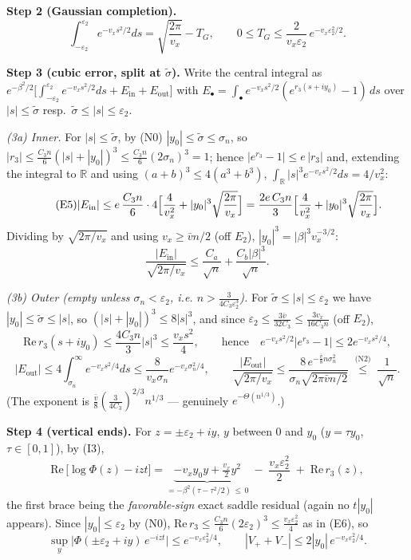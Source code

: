 \documentclass[
]{article}
\begin{document}
\textbf{Step 2 (Gaussian completion).}
\[
  \tag{E3}
  \int_{-\varepsilon_2}^{\varepsilon_2}e^{-v_xs^2/2}ds
  =\sqrt{\frac{2\pi}{v_x}}-T_G,
  \qquad
  0\le T_G\le\frac{2}{v_x\varepsilon_2}\,
  e^{-v_x\varepsilon_2^2/2}.
\]

\textbf{Step 3 (cubic error, split at $\tilde\sigma$).}  Write the
central integral as
$e^{-\beta^2/2}\bigl[\int_{-\varepsilon_2}^{\varepsilon_2}
e^{-v_xs^2/2}ds+E_{\mathrm{in}}+E_{\mathrm{out}}\bigr]$ with
$E_{\bullet}=\int_{\bullet}e^{-v_xs^2/2}(e^{r_3(s+iy_0)}-1)\,ds$ over
$|s|\le\tilde\sigma$ resp.\ $\tilde\sigma\le|s|\le\varepsilon_2$.

\emph{(3a) Inner.}  For $|s|\le\tilde\sigma$, by (N0)
$|y_0|\le\tilde\sigma\le\sigma_n$, so
$|r_3|\le\tfrac{C_3n}{6}(|s|+|y_0|)^3\le\tfrac{C_3n}{6}(2\sigma_n)^3=1$;
hence $|e^{r_3}-1|\le e\,|r_3|$ and, extending the integral to
$\mathbb R$ and using $(a+b)^3\le4(a^3+b^3)$,
$\int_{\mathbb R}|s|^3e^{-v_xs^2/2}ds=4/v_x^2$:
\[
  \tag{E5}
  |E_{\mathrm{in}}|
  \le e\,\frac{C_3n}{6}\cdot4\Bigl[\frac{4}{v_x^{2}}
  +|y_0|^3\sqrt{\frac{2\pi}{v_x}}\Bigr]
  =\frac{2e\,C_3n}{3}\Bigl[\frac{4}{v_x^{2}}
  +|y_0|^3\sqrt{\frac{2\pi}{v_x}}\Bigr].
\]
Dividing by $\sqrt{2\pi/v_x}$ and using $v_x\ge\bar vn/2$ (off $E_2$),
$|y_0|^3=|\beta|^3v_x^{-3/2}$:
\[
  \tag{E5$'$}
  \frac{|E_{\mathrm{in}}|}{\sqrt{2\pi/v_x}}
  \le\frac{C_a}{\sqrt n}+\frac{C_b|\beta|^3}{\sqrt n}.
\]

\emph{(3b) Outer (empty unless $\sigma_n<\varepsilon_2$, i.e.
$n>\tfrac{3}{4C_3\varepsilon_2^3}$).}  For
$\tilde\sigma\le|s|\le\varepsilon_2$ we have $|y_0|\le\tilde\sigma\le
|s|$, so $(|s|+|y_0|)^3\le8|s|^3$, and since
$\varepsilon_2\le\tfrac{3\bar v}{32C_3}\le\tfrac{3v_x}{16C_3n}$ (off
$E_2$),
\[
  \tag{E6}
  \mathrm{Re}\,r_3(s+iy_0)\le\frac{4C_3n}{3}|s|^3
  \le\frac{v_x s^2}{4},
  \qquad\text{hence}\quad
  e^{-v_xs^2/2}\bigl|e^{r_3}-1\bigr|\le2e^{-v_xs^2/4},
\]
\[
  \tag{E7}
  |E_{\mathrm{out}}|\le4\int_{\sigma_n}^{\infty}e^{-v_xs^2/4}ds
  \le\frac{8}{v_x\sigma_n}e^{-v_x\sigma_n^2/4},
  \qquad
  \frac{|E_{\mathrm{out}}|}{\sqrt{2\pi/v_x}}
  \le\frac{8\,e^{-\frac{\bar v}{8}n\sigma_n^2}}
  {\sigma_n\sqrt{2\pi\bar vn/2}}
  \;\overset{\text{(N2)}}{\le}\;\frac{1}{\sqrt n}.
\]
(The exponent is $\tfrac{\bar v}{8}(\tfrac{3}{4C_3})^{2/3}n^{1/3}$ ---
genuinely $e^{-\Theta(n^{1/3})}$.)

\textbf{Step 4 (vertical ends).}  For $z=\pm\varepsilon_2+iy$, $y$
between $0$ and $y_0$ ($y=\tau y_0$, $\tau\in[0,1]$), by (I3),
\[
  \mathrm{Re}\,\bigl[\log\Phi(z)-izt\bigr]
  =\underbrace{-v_x y_0 y+\tfrac{v_x}{2}y^2}_{=-\beta^2(\tau-\tau^2/2)
  \,\le\,0}
  \;-\;\frac{v_x\varepsilon_2^2}{2}
  \;+\;\mathrm{Re}\,r_3(z),
\]
the first brace being the \emph{favorable-sign} exact saddle residual
(again no $t|y_0|$ appears).  Since $|y_0|\le\varepsilon_2$ by (N0),
$\mathrm{Re}\,r_3\le\tfrac{C_3n}{6}(2\varepsilon_2)^3\le
\tfrac{v_x\varepsilon_2^2}{4}$ as in (E6), so
\[
  \tag{E8}
  \sup_{y}\bigl|\Phi(\pm\varepsilon_2+iy)\,e^{-izt}\bigr|
  \le e^{-v_x\varepsilon_2^2/4},
  \qquad
  |V_++V_-|\le2|y_0|\,e^{-v_x\varepsilon_2^2/4}.
\]
\end{document}
